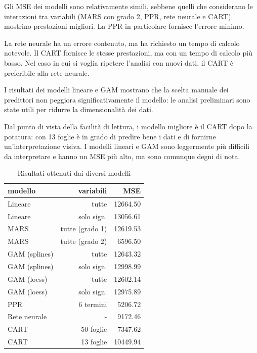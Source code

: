 \documentclass[a4paper, 10pt]{report}
\begin{document}
Gli MSE dei modelli sono relativamente simili, sebbene quelli che
considerano le interazioni tra variabili (MARS con grado 2, PPR, rete
neurale e CART) mostrino prestazioni migliori. La PPR in particolare
fornisce l'errore minimo.

La rete neurale ha un errore contenuto, ma ha richiesto un tempo di
calcolo notevole. Il CART fornisce le stesse prestazioni, ma con un
tempo di calcolo più basso. Nel caso in cui si voglia ripetere
l'analisi con nuovi dati, il CART è preferibile alla rete neurale.

I risultati dei modelli lineare e GAM mostrano che la scelta manuale dei
predittori non peggiora significativamente il modello: le analisi
preliminari sono state utili per ridurre la dimensionalità dei dati.

Dal punto di vista della facilità di lettura, i modello migliore è il CART
dopo la potatura: con 13 foglie è in grado di predire bene i dati e di
fornirne un'interpretazione visiva. I modelli lineari e GAM sono
leggermente più difficili da interpretare e hanno un MSE più alto, ma
sono comunque degni di nota.

\begin{table}
  \centering
  \begin{tabular}{|| l | r | r ||}
    \hline
    modello       & variabili       & MSE      \\
    \hline \hline
    Lineare       & tutte           & 12664.50 \\
    Lineare       & solo sign.      & 13056.61 \\
    MARS          & tutte (grado 1) & 12619.53 \\
    MARS          & tutte (grado 2) &  6596.50 \\
    GAM (splines) & tutte           & 12643.32 \\
    GAM (splines) & solo sign.      & 12998.99 \\
    GAM (loess)   & tutte           & 12602.14 \\
    GAM (loess)   & solo sign.      & 12975.89 \\
    PPR           & 6 termini       &  5206.72 \\
    Rete neurale  & -               &  9172.46 \\
    CART          & 50  foglie      &  7347.62 \\
    CART          & 13  foglie      & 10449.94 \\
    \hline
  \end{tabular}
  \caption{Risultati ottenuti dai diversi modelli}
  \label{tab:comparison}
\end{table}
\end{document}
